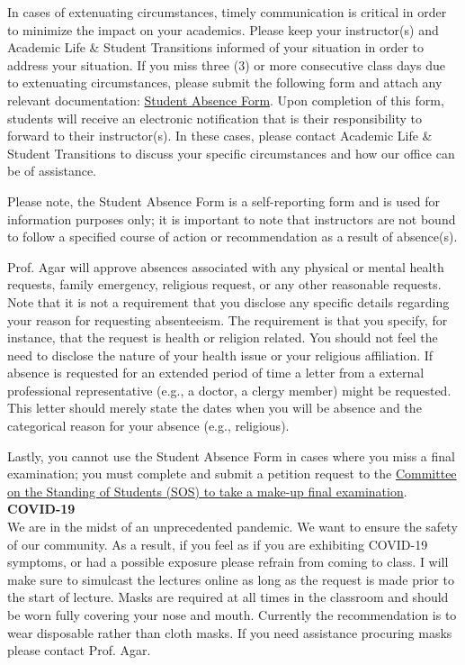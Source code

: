 \documentclass[11pt,letterpaper]{article}
\newcommand{\lefthead}[2]{\noindent\textbf{#1}\hfill\\[#2]}
\begin{document}
In cases of extenuating circumstances, timely communication is critical in order to minimize the impact on your academics. Please keep your instructor(s) and Academic Life & Student Transitions informed of your situation in order to address your situation. If you miss three (3) or more consecutive class days due to extenuating circumstances, please submit the following form and attach any relevant documentation: \href{http://www.lehigh.edu/go/absenceform}{Student Absence Form}. Upon completion of this form, students will receive an electronic notification that is their responsibility to forward to their instructor(s). In these cases, please contact Academic Life & Student Transitions to discuss your specific circumstances and how our office can be of assistance.

Please note, the Student Absence Form is a self-reporting form and is used for information purposes only; it is important to note that instructors are not bound to follow a specified course of action or recommendation as a result of absence(s). 

Prof. Agar will approve absences associated with any physical or mental health requests, family emergency, religious request, or any other reasonable requests. Note that it is not a requirement that you disclose any specific details regarding your reason for requesting absenteeism. The requirement is that you specify, for instance, that the request is health or religion related. You should not feel the need to disclose the nature of your health issue or your religious affiliation. If absence is requested for an extended period of time a letter from a external professional representative (e.g., a doctor, a clergy member) might be requested. This letter should merely state the dates when you will be absence and the categorical reason for your absence (e.g., religious).      

Lastly, you cannot use the Student Absence Form in cases where you miss a final examination; you must complete and submit a petition request to the \href{https://studentaffairs.lehigh.edu/content/committee-standing-students}{Committee on the Standing of Students (SOS) to take a make-up final examination}. \\[0.3cm]

\lefthead{COVID-19}{0.3cm}
We are in the midst of an unprecedented pandemic. 
We want to ensure the safety of our community.
As a result, if you feel as if you are exhibiting COVID-19 symptoms, or had a possible exposure please refrain from coming to class.
I will make sure to simulcast the lectures online as long as the request is made prior to the start of lecture.
Masks are required at all times in the classroom and should be worn fully covering your nose and mouth.
Currently the recommendation is to wear disposable rather than cloth masks.
If you need assistance procuring masks please contact Prof. Agar.
\\[0.3cm]
\end{document}
